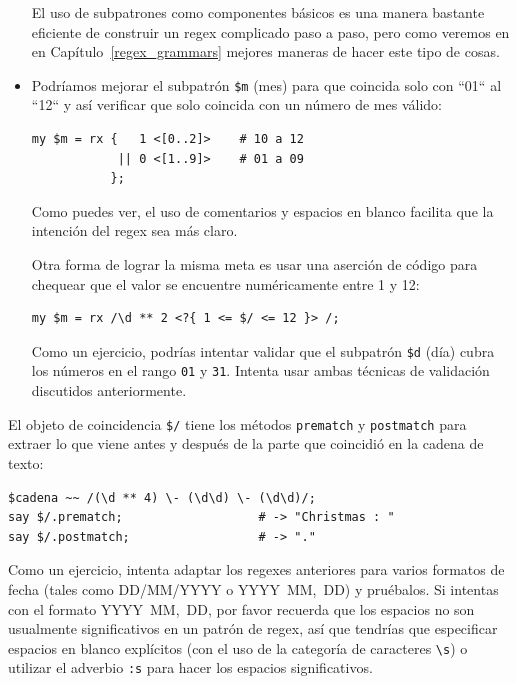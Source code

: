 \begin{itemize}
El uso de subpatrones como componentes básicos es una manera
bastante eficiente de construir un regex complicado paso a
paso, pero como veremos en en Capítulo~\ref{regex_grammars}
mejores maneras de hacer este tipo de cosas.

\item Podríamos mejorar el subpatrón \verb'$m' (mes) 
para que coincida solo con ``01`` al ``12`` y así 
verificar que solo coincida con un número de mes válido:

\begin{lstlisting}
my $m = rx {   1 <[0..2]>    # 10 a 12
            || 0 <[1..9]>    # 01 a 09
           };
\end{lstlisting}
%

Como puedes ver, el uso de comentarios y espacios en blanco
facilita que la intención del regex sea más claro.

Otra forma de lograr la misma meta es usar una aserción de
código para chequear que el valor se encuentre numéricamente
entre 1 y 12:

\begin{lstlisting}
my $m = rx /\d ** 2 <?{ 1 <= $/ <= 12 }> /;
\end{lstlisting}

Como un ejercicio, podrías intentar validar que el 
subpatrón \verb|$d| (día) cubra los números en el rango
\verb|01| y \verb|31|. Intenta usar ambas técnicas de validación
discutidos anteriormente.

\end{itemize}

El objeto de coincidencia \verb|$/| tiene los métodos 
{\tt prematch} y {\tt postmatch} para extraer lo que 
viene antes y después de la parte que coincidió en la 
cadena de texto:

\begin{lstlisting}
$cadena ~~ /(\d ** 4) \- (\d\d) \- (\d\d)/;
say $/.prematch;                   # -> "Christmas : "
say $/.postmatch;                  # -> "."
\end{lstlisting}
%

Como un ejercicio, intenta adaptar los regexes anteriores
para varios formatos de fecha (tales como DD/MM/YYYY o 
YYYY~MM,~DD) y pruébalos. Si intentas con el formato
YYYY~MM,~DD, por favor recuerda que los espacios no son
usualmente significativos en un patrón de regex, así que 
tendrías que especificar espacios en blanco explícitos
(con el uso de la categoría de caracteres \verb|\s|) o 
utilizar el adverbio \verb|:s| para hacer los espacios
significativos.

